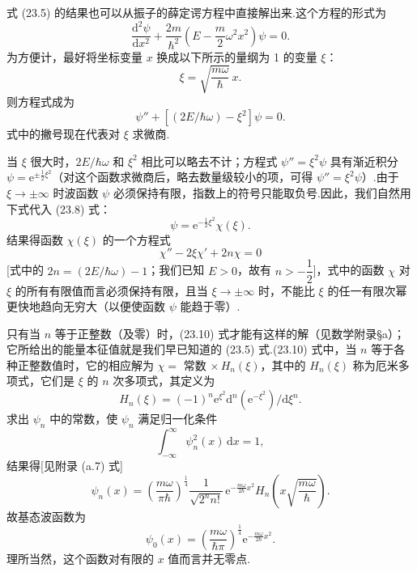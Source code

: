 式 (23.5) 的结果也可以从振子的薛定谔方程中直接解出来.这个方程的形式为
\begin{equation}
  \frac{\mathrm{d}^2\psi}{\mathrm{d}x^2}
  +\frac{2m}{\hbar^2}
  \left(E-\frac{m}{2}\omega^2x^2\right)\psi=0.
\end{equation}
为方便计，最好将坐标变量 $x$ 换成以下所示的量纲为 1 的变量 $\xi$：
\begin{equation}
  \xi=\sqrt{\frac{m\omega}{\hbar}}\,x.
\end{equation}
则方程式成为
\begin{equation}
  \psi''+\left[\left(2E/\hbar\omega\right)-\xi^2\right]\psi=0.
\end{equation}
式中的撇号现在代表对 $\xi$ 求微商.

当 $\xi$ 很大时，$2E/\hbar\omega$ 和 $\xi^2$ 相比可以略去不计；方程式 $\psi''=\xi^2\psi$ 具有渐近积分 $\psi=\mathrm{e}^{\pm\frac{1}{2}\xi^2}$（对这个函数求微商后，略去数量级较小的项，可得 $\psi''=\xi^2\psi$）.由于 $\xi\to\pm\infty$ 时波函数 $\psi$ 必须保持有限，指数上的符号只能取负号.因此，我们自然用下式代入 (23.8) 式：
\begin{equation}
  \psi=\mathrm{e}^{-\frac{1}{2}\xi^2}\chi(\xi).
\end{equation}
结果得函数 $\chi(\xi)$ 的一个方程式
\begin{equation}
  \chi''-2\xi\chi'+2n\chi=0
\end{equation}
[式中的 $2n=\left(2E/\hbar\omega\right)-1$；我们已知 $E>0$，故有 $n>-\dfrac{1}{2}$]，式中的函数 $\chi$ 对 $\xi$ 的所有有限值而言必须保持有限，且当 $\xi\to\pm\infty$ 时，不能比 $\xi$ 的任一有限次幂更快地趋向无穷大（以便使函数 $\psi$ 能趋于零）.

只有当 $n$ 等于正整数（及零）时，(23.10) 式才能有这样的解（见数学附录§a）；它所给出的能量本征值就是我们早已知道的 (23.5) 式.(23.10) 式中，当 $n$ 等于各种正整数值时，它的相应解为 $\chi=$ 常数 $\times\,H_n(\xi)$，其中的 $H_n(\xi)$ 称为厄米多项式，它们是 $\xi$ 的 $n$ 次多项式，其定义为
\begin{equation}
  H_n(\xi)=\left(-1\right)^n
  \mathrm{e}^{\xi^2}\mathrm{d}^n\left(\mathrm{e}^{-\xi^2}\right)/\mathrm{d}\xi^n.
\end{equation}
求出 $\psi_n$ 中的常数，使 $\psi_n$ 满足归一化条件
\begin{equation*}
  \int_{-\infty}^{\infty}\psi_n^2(x)\,\mathrm{d}x=1,
\end{equation*}
结果得[见附录 (a.7) 式]
\begin{equation}
  \psi_n(x)=\left(\frac{m\omega}{\pi\hbar}\right)^{\frac{1}{4}}
  \frac{1}{\sqrt{2^n n!}}\,
  \mathrm{e}^{-\frac{m\omega}{2\hbar}x^2}
  H_n\left(x\sqrt{\frac{m\omega}{\hbar}}\right).
\end{equation}
故基态波函数为
\begin{equation}
  \psi_0(x)=\left(\frac{m\omega}{\hbar\pi}\right)^{\frac{1}{4}}
  \mathrm{e}^{-\frac{m\omega}{2\hbar}x^2}.
\end{equation}
理所当然，这个函数对有限的 $x$ 值而言并无零点.

